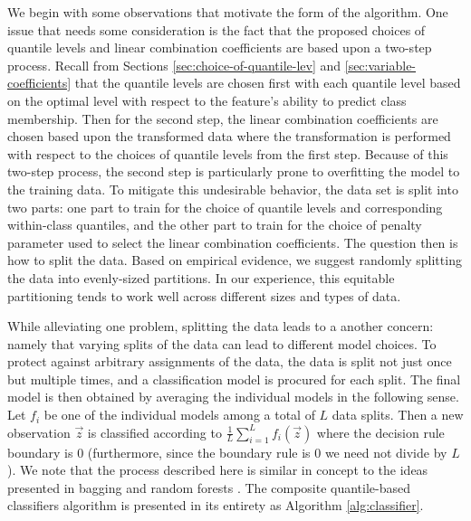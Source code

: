 We begin with some observations that motivate the form of the algorithm.  One
issue that needs some consideration is the fact that the proposed choices of
quantile levels and linear combination coefficients are based upon a two-step
process.  Recall from Sections \ref{sec:choice-of-quantile-lev} and
\ref{sec:variable-coefficients} that the quantile levels are chosen first with
each quantile level based on the optimal level with respect to the feature's
ability to predict class membership.  Then for the second step, the linear
combination coefficients are chosen based upon the transformed data where the
transformation is performed with respect to the choices of quantile levels from
the first step.  Because of this two-step process, the second step is
particularly prone to overfitting the model to the training data.  To mitigate
this undesirable behavior, the data set is split into two parts: one part to
train for the choice of quantile levels and corresponding within-class
quantiles, and the other part to train for the choice of penalty parameter used
to select the linear combination coefficients.  The question then is how to
split the data.  Based on empirical evidence, we suggest randomly splitting the
data into evenly-sized partitions.  In our experience, this equitable
partitioning tends to work well across different sizes and types of data.

While alleviating one problem, splitting the data leads to a another concern:
namely that varying splits of the data can lead to different model choices.  To
protect against arbitrary assignments of the data, the data is split not just
once but multiple times, and a classification model is procured for each split.
The final model is then obtained by averaging the individual models in the
following sense.  Let $f_i$ be one of the individual models among a total of $L$
data splits.  Then a new observation $\vec{z}$ is classified according to
$\frac{1}{L} \sum_{i=1}^L f_i(\vec{z})$ where the decision rule boundary is 0
(furthermore, since the boundary rule is 0 we need not divide by $L$).  We note
that the process described here is similar in concept to the ideas presented in
bagging \cite{breiman1996} and random forests \cite{breiman2001}.  The composite
quantile-based classifiers algorithm is presented in its entirety as Algorithm
\ref{alg:classifier}.


